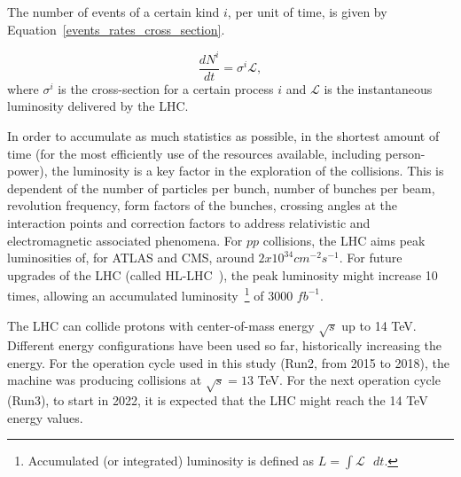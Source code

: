 The number of events of a certain kind $i$, per unit of time, is given by Equation~\ref{events_rates_cross_section}.

\begin{equation}
    \frac{dN^{i}}{dt} = \sigma^{i} \mathcal{L},
    \label{events_rates_cross_section}
\end{equation}
where $\sigma^{i}$ is the cross-section for a certain process $i$ and $\mathcal{L}$ is the instantaneous luminosity delivered by the LHC.

 In order to accumulate as much statistics as possible, in the shortest amount of time (for the most efficiently use of the resources available, including person-power), the luminosity is a key factor in the exploration of the collisions. This is dependent of the number of particles per bunch, number of bunches per beam, revolution frequency, form factors of the bunches, crossing angles at the interaction points and correction factors to address relativistic and electromagnetic associated phenomena. For $pp$ collisions, the LHC aims peak luminosities of, for ATLAS and CMS, around $2x10^{34} cm^{-2}s^{-1}$. For future upgrades of the LHC (called HL-LHC~\cite{ApollinariG.:2017ojx}), the peak luminosity might increase 10 times, allowing an accumulated luminosity~\footnote{Accumulated (or integrated) luminosity is defined as $L = \int \mathcal{L}\text{ }dt$.} of 3000 $fb^{-1}$.

 The LHC can collide protons with center-of-mass energy $\sqrt{s}$ up to 14 TeV. Different energy configurations have been used so far, historically increasing the energy. For the operation cycle used in this study (Run2, from 2015 to 2018), the machine was producing collisions at $\sqrt{s} = 13$ TeV. For the next operation cycle (Run3), to start in 2022, it is expected that the LHC might reach the 14 TeV energy values.